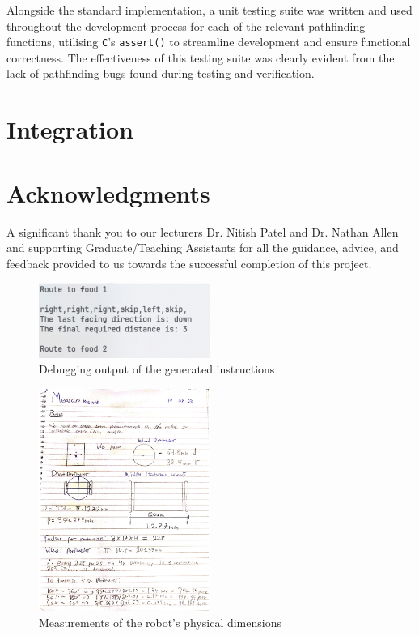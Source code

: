 \documentclass[conference]{IEEEtran}
\begin{document}
Alongside the standard implementation, a unit testing suite was written and used throughout the development process for each of the relevant pathfinding functions, utilising \texttt{C}'s \texttt{assert()} to streamline development and ensure functional correctness.
The effectiveness of this testing suite was clearly evident from the lack of pathfinding bugs found during testing and verification.

\section{Integration}



\section*{Acknowledgments}

A significant thank you to our lecturers Dr. Nitish Patel and Dr. Nathan Allen and supporting Graduate/Teaching Assistants for all the guidance, advice, and feedback provided to us towards the successful completion of this project.


\nocite{*}



\appendix

\begin{figure}[htbp]
	\centerline{\includegraphics[width=0.5\textwidth]{pathfinding-instructions.png}}
	\caption{Debugging output of the generated instructions}
	\label{fig:pathfinding-instructions}
\end{figure}

\begin{figure}[htbp]
	\centerline{\includegraphics[width=0.5\textwidth]{physical-measurements.png}}
	\caption{Measurements of the robot's physical dimensions}
	\label{fig:physical-dimensions}
\end{figure}
\end{document}

